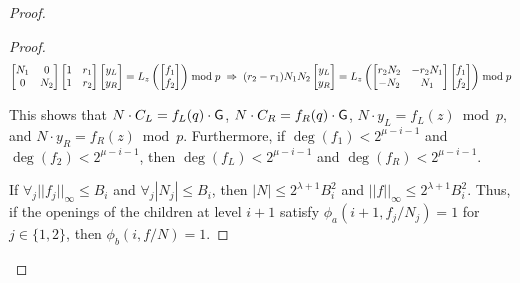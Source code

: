 \begin{proof}
\begin{proof}
\begin{equation*}
\begin{bmatrix}
N_1 & 0 \\
0 & N_2 \\
\end{bmatrix} 
\begin{bmatrix}
1 & r_1 \\
1 & r_2 \\
\end{bmatrix} 
\begin{bmatrix}
y_L \\
y_R \\
\end{bmatrix} 
= 
L_z \left(
\begin{bmatrix}
f_1 \\
f_2\\
\end{bmatrix}
\right) \bmod p
\hspace{1mm}
\Rightarrow
\hspace{1mm}
(r_2 - r_1) N_1 N_2 
\begin{bmatrix}
y_L \\
y_R \\
\end{bmatrix}
= 
L_z \left(
\begin{bmatrix}
r_2 N_2 & -r_2 N_1 \\
-N_2 & N_1 \\
\end{bmatrix}
\begin{bmatrix}
f_1 \\
f_2 \\
\end{bmatrix}
\right)
\bmod p
\end{equation*} 

This shows that $N \cdot C_L = f_L(q) \cdot \mathsf{G}$, $N \cdot C_R = f_R(q) \cdot \mathsf{G}$, $N \cdot y_L = f_L(z) \bmod p$, and $N \cdot y_R = f_R(z) \bmod p$. Furthermore, if $\deg(f_1) < 2^{\mu - i - 1}$ and $\deg(f_2) < 2^{\mu - i - 1}$, then $\deg(f_L) < 2^{\mu - i-1}$ and $\deg(f_R) < 2^{\mu -i -1}$. 


If $\forall _j ||f_j||_\infty \leq B_i$ and $\forall_j |N_j| \leq B_i$,  then $|N|  \leq 2^{\lambda + 1} B_i^2$ and $||f||_\infty \leq 2^{\lambda + 1} B_i^2$. Thus, if the openings of the children at level $i+1$ satisfy $\phi_a(i+1, f_j/N_j) = 1$ for $j \in \{1, 2\}$, then $\phi_b(i, f/N) = 1$. %
\end{proof} 




\end{proof}
